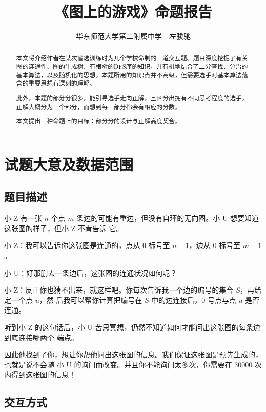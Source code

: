 \documentclass{noithesis}
\begin{document}

\title{《图上的游戏》命题报告}
\author{华东师范大学第二附属中学~~左骏驰}

\maketitle

\begin{abstract}
本文将介绍作者在某次省选训练时为几个学校命制的一道交互题。题目深度挖掘了有关图的连通性、图的生成树、有根树的DFS序的知识，并有机地结合了二分查找、分治的基本算法，以及随机化的思想。本题所用的知识点并不高级，但需要选手对基本算法蕴含的重要思想有深刻的理解。

此外，本题的部分分很多，能引导选手走向正解，且区分出拥有不同思考程度的选手。正解大概分为三个部分，而想到每一部分都会有相应的分数。

本文提出一种命题上的目标：部分分的设计与正解高度契合。
\end{abstract}

\section{试题大意及数据范围}

\subsection{题目描述}


小 Z 有一张 $n$ 个点 $m$ 条边的可能有重边，但没有自环的无向图。小 U 想要知道这张图的样子，但小 Z 不肯告诉
它。

小 Z：我可以告诉你这张图是连通的，点从 $0$ 标号至 $n - 1$，边从 $0$ 标号至 $m - 1$。

小 U：好那删去一条边后，这张图的连通状况如何呢？

小 Z：反正你也猜不出来，就这样吧。你每次告诉我一个边的编号的集合 $S$，再给定一个点 $u$，然
后我可以帮你计算把编号在 $S$ 中的边连接后，$0$ 号点与点 $u$ 是否连通。

听到小 Z 的这句话后，小 U 苦思冥想，仍然不知道如何才能问出这张图的每条边到底连接哪两个
端点。

因此他找到了你，想让你帮他问出这张图的信息。我们保证这张图是预先生成的，也就是说不会随
小 U 的询问而改变。并且你不能询问太多次，你需要在 30000 次内得到这张图的信息！

\subsection{交互方式}
\end{document}
